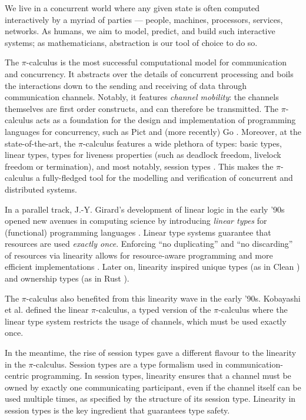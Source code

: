 \documentclass[a4paper,UKenglish,cleveref, autoref, thm-restate,authorcolumns]{lipics-v2019}
\theoremstyle{definition}
\newcommand{\picalc}{$\pi$-calculus}
\begin{document}
We live in a concurrent world where any given state is often computed interactively by a myriad of parties --- people, machines, processors, services, networks.
As humans, we aim to model, predict, and build such interactive systems; as mathematicians, abstraction is our tool of choice to do so.

The \picalc{} \cite{MilnerPW92,Milner99} is the most successful computational model for communication and concurrency.
It abstracts over the details of concurrent processing and boils the interactions down to the sending and receiving of data through communication channels.
Notably, it features \emph{channel mobility}: the channels themselves are first order constructs, and can therefore be transmitted.
The \picalc{} acts as a foundation for the design and implementation of programming languages for concurrency, such as Pict \cite{Pierce} and (more recently) Go \cite{Golang}.
Moreover, at the state-of-the-art, the \picalc{} features a wide plethora of types: basic types, linear types, types for liveness properties (such as deadlock freedom, livelock freedom or termination), and most notably, session types \cite{K07}. This makes the \picalc{} a fully-fledged tool for the modelling and verification of concurrent and distributed systems.

In a parallel track, J.-Y. Girard's development of linear logic \cite{Girard87} in the early '90s opened new avenues in computing science by introducing \emph{linear types} for (functional) programming languages \cite{Curry-Howard,Wadler90,Bernardy2018}.
Linear type systems guarantee that resources are used \emph{exactly once}.
Enforcing ``no duplicating'' and ``no discarding'' of resources via linearity allows for resource-aware programming and more efficient implementations \cite{Wadler90}.
Later on, linearity inspired unique types (as in Clean \cite{BarendsenS96}) and ownership types (as in Rust \cite{MatsakisK14}).

The \picalc{} also benefited from this linearity wave in the early '90s.
Kobayashi et al. \cite{KPT96} defined the {linear} \picalc{}, a typed version of the \picalc{} where the linear type system restricts the usage of channels, which must be used exactly once.

In the meantime, the rise of session types \cite{H93,THK94,HVK98} gave a different flavour to the linearity in the \picalc{}.
Session types are a type formalism used in communication-centric programming.
In session types, linearity ensures that a channel must be owned by exactly one communicating participant, even if the channel itself can be used multiple times, as specified by the structure of its session type.
Linearity in session types is the key ingredient that guarantees type safety.
\end{document}
